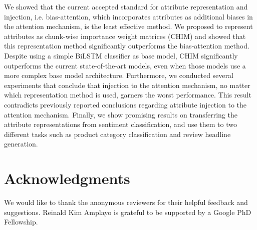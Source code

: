\documentclass[11pt,a4paper]{article}
\begin{document}
We showed that the current accepted standard for attribute representation and injection, i.e.  bias-attention, which incorporates attributes as additional biases in the attention mechanism, is the least effective method. We proposed to represent attributes as chunk-wise importance weight matrices (CHIM) and showed that this representation method significantly outperforms the bias-attention method. Despite using a simple BiLSTM classifier as base model, CHIM significantly outperforms the current state-of-the-art models, even when those models use a more complex base model architecture. 
Furthermore, we conducted several experiments that conclude that injection to the attention mechanism, no matter which representation method is used, garners the worst performance. This result contradicts previously reported conclusions regarding attribute injection to the attention mechanism.
Finally, we show promising results on transferring the attribute representations from sentiment classification, and use them to two different tasks such as product category classification and review headline generation.

\section*{Acknowledgments}

We would like to thank the anonymous reviewers for their helpful feedback and suggestions. Reinald Kim Amplayo is grateful to be supported by a Google PhD Fellowship.



\end{document}
